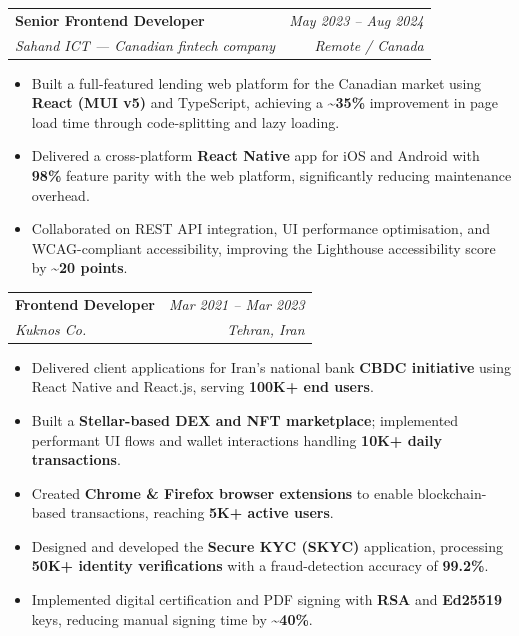 \documentclass[10pt, a4paper]{article}
\makeatletter
\newcommand{\resumeEntry}[4]{%
  \noindent
  \begin{tabularx}{\textwidth}{@{}X r@{}}
    \textbf{\large #1} & \textit{\small\color{medgray}#2}\\[1pt]
    \textcolor{accent}{\textit{#3}} & \textit{\small\color{medgray}#4}
  \end{tabularx}
  \vspace{3pt}
}
\newcommand{\separator}{\vspace{7pt}}
\makeatother
\begin{document}
\separator

\resumeEntry{Senior Frontend Developer}{May 2023 -- Aug 2024}%
{Sahand ICT \normalfont\textit{--- Canadian fintech company}}{Remote / Canada}

\begin{itemize}
  \item Built a full-featured lending web platform for the Canadian market using \textbf{React (MUI
        v5)} and TypeScript, achieving a \textbf{\textasciitilde{}35\%} improvement in page load time
        through code-splitting and lazy loading.
  \item Delivered a cross-platform \textbf{React Native} app for iOS and Android with \textbf{98\%}
        feature parity with the web platform, significantly reducing maintenance overhead.
  \item Collaborated on REST API integration, UI performance optimisation, and WCAG-compliant
        accessibility, improving the Lighthouse accessibility score by \textbf{\textasciitilde{}20
        points}.
\end{itemize}

\separator

\resumeEntry{Frontend Developer}{Mar 2021 -- Mar 2023}%
{Kuknos Co.}{Tehran, Iran}

\begin{itemize}
  \item Delivered client applications for Iran's national bank \textbf{CBDC initiative} using React
        Native and React.js, serving \textbf{100K+ end users}.
  \item Built a \textbf{Stellar-based DEX and NFT marketplace}; implemented performant UI flows and
        wallet interactions handling \textbf{10K+ daily transactions}.
  \item Created \textbf{Chrome \& Firefox browser extensions} to enable blockchain-based
        transactions, reaching \textbf{5K+ active users}.
  \item Designed and developed the \textbf{Secure KYC (SKYC)} application, processing \textbf{50K+
        identity verifications} with a fraud-detection accuracy of \textbf{99.2\%}.
  \item Implemented digital certification and PDF signing with \textbf{RSA} and \textbf{Ed25519}
        keys, reducing manual signing time by \textbf{\textasciitilde{}40\%}.
\end{itemize}

\separator
\end{document}
